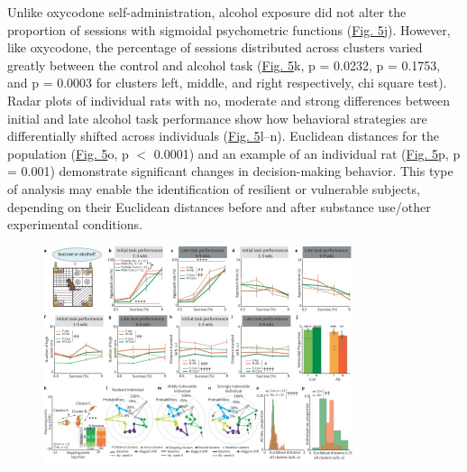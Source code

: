 \documentclass{article}
\begin{document}
\vspace{1em}

Unlike oxycodone self-administration, alcohol exposure did not alter the proportion of sessions with sigmoidal psychometric functions (\hyperref[fig:Record_main_5]{Fig. 5}j). However, like oxycodone, the percentage of sessions distributed across clusters varied greatly between the control and alcohol task (\hyperref[fig:Record_main_5]{Fig. 5}k, p = 0.0232, p = 0.1753, and p = 0.0003 for clusters left, middle, and right respectively, chi square test). Radar plots of individual rats with no, moderate and strong differences between initial and late alcohol task performance show how behavioral strategies are differentially shifted across individuals (\hyperref[fig:Record_main_5]{Fig. 5}l–n). Euclidean distances for the population (\hyperref[fig:Record_main_5]{Fig. 5}o, p $<$ 0.0001) and an example of an individual rat (\hyperref[fig:Record_main_5]{Fig. 5}p, p = 0.001) demonstrate significant changes in decision-making behavior. This type of analysis may enable the identification of resilient or vulnerable subjects, depending on their Euclidean distances before and after substance use/other experimental conditions.

\begin{figure}
  \centering
  \includegraphics[width=\textwidth]{Figs/Record_main_5.pdf}
  \label{fig:Record_main_5}
\end{figure}

\clearpage
\end{document}

